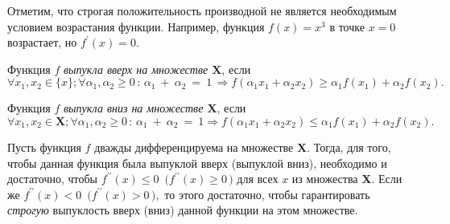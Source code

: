 \documentclass[10pt]{article}
\begin{document}
\begin{remark}
 Отметим, что строгая положительность производной не является необходимым условием возрастания функции.
Например, функция $f(x) = x^{3}$ в точке $x=0$ возрастает, но $f^{\prime}(x) = 0$.
\end{remark}


\begin{definition}
 Функция $f$ \emph{выпукла вверх на множестве $\textbf{X}$}, если 
 \vspace{-2ex}
$$\forall x_1, x_2 \in \{x\}; \forall \alpha_1, \alpha_2 \geqslant 0 \, : \, \alpha_1~+~\alpha_2~=~1 \, \Rightarrow f(\alpha_1 x_1 + \alpha_2 x_2) \geqslant \alpha_1 f(x_1) + \alpha_2 f(x_2).$$
\end{definition}

\begin{definition}
Функция $f$ \emph{выпукла вниз на множестве $\textbf{X}$}, если 
 \vspace{-2ex}
$$\forall x_1, x_2 \in \textbf{X}; \forall \alpha_1, \alpha_2 \geqslant 0 \, : \, \alpha_1~+~\alpha_2~=~1 \Rightarrow f(\alpha_1 x_1+\alpha_2 x_2) \leqslant \alpha_1 f(x_1)+\alpha_2 f(x_2).$$
\vspace{-3ex}
\end{definition}



\begin{proposition}

Пусть функция $f$ дважды дифференцируема на множестве $\textbf{X}$. Тогда, для того, чтобы данная функция была выпуклой вверх (выпуклой вниз), необходимо и достаточно, чтобы $f^{\prime \prime}(x) \le 0 \,$ $\bigl(f^{\prime \prime}(x) \ge 0 \,\bigr)$ для всех $x$ из множества $\textbf{X}$. Если же $f^{\prime \prime}(x) < 0 \,$ $\bigl(f^{\prime \prime}(x) > 0 \,\bigr),$ то этого достаточно, чтобы гарантировать \textsf{\textsl{строгую}} выпуклость вверх (вниз) данной функции на этом множестве.
\end{proposition}
\end{document}
